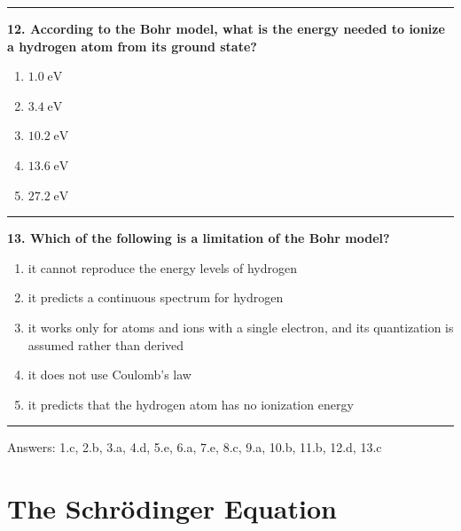 \documentclass[
  english,
  9pt,
]{extbook}
\providecommand{\tightlist}{%
  \setlength{\itemsep}{0pt}\setlength{\parskip}{0pt}}
\theoremstyle{definition}
\theoremstyle{definition}
\theoremstyle{definition}
\theoremstyle{definition}
\theoremstyle{remark}
\begin{document}
\begin{center}\rule{0.5\linewidth}{0.5pt}\end{center}

\textbf{12. According to the Bohr model, what is the energy needed to ionize a hydrogen atom from its ground state?}

\begin{enumerate}
\def\labelenumi{\alph{enumi}.}
\tightlist
\item
  \(1.0\;\text{eV}\)\\
\item
  \(3.4\;\text{eV}\)\\
\item
  \(10.2\;\text{eV}\)\\
\item
  \(13.6\;\text{eV}\)\\
\item
  \(27.2\;\text{eV}\)
\end{enumerate}

\begin{center}\rule{0.5\linewidth}{0.5pt}\end{center}

\textbf{13. Which of the following is a limitation of the Bohr model?}

\begin{enumerate}
\def\labelenumi{\alph{enumi}.}
\tightlist
\item
  it cannot reproduce the energy levels of hydrogen\\
\item
  it predicts a continuous spectrum for hydrogen\\
\item
  it works only for atoms and ions with a single electron, and its quantization is assumed rather than derived\\
\item
  it does not use Coulomb's law\\
\item
  it predicts that the hydrogen atom has no ionization energy
\end{enumerate}

\begin{center}\rule{0.5\linewidth}{0.5pt}\end{center}

Answers: 1.c, 2.b, 3.a, 4.d, 5.e, 6.a, 7.e, 8.c, 9.a, 10.b, 11.b, 12.d, 13.c

\chapter{The Schrödinger Equation}\label{Schrodinger}
\end{document}
